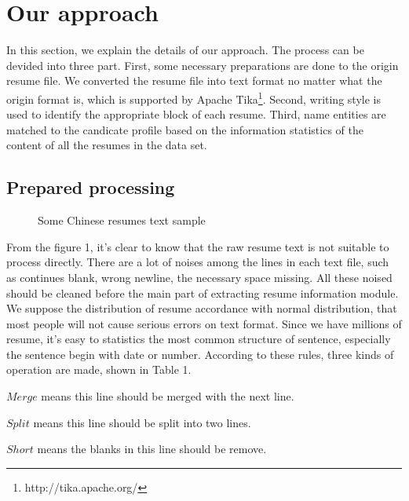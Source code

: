\documentclass{acm_proc_article-sp}
\begin{document}
\section{Our approach}

In this section, we explain the details of our approach. 
The process can be devided into three part. 
First, some necessary preparations are done to the origin resume file. 
We converted the resume file into text format no matter what the origin format is, which is supported by Apache Tika\footnote{http://tika.apache.org/}. 
Second, writing style is used to identify the appropriate  block of each resume.
Third, name entities are matched to the candicate profile based on the information statistics of the content of all the resumes in the data set. 

\subsection{Prepared processing}


\begin{figure}
\centering
{}
\caption{Some Chinese resumes text sample}
\end{figure}


From the figure 1, it's clear to know that the raw resume text is not suitable to process directly. 
There are a lot of noises among the lines in each text file, such as continues blank, wrong newline, the necessary space missing. 
All these noised should be cleaned before the main part of extracting resume information module. 
We suppose the distribution of resume accordance with normal distribution, that most people will not cause serious errors on text format.
Since we have millions of resume, it's easy to statistics the most common structure of sentence, especially the sentence begin with date or number. 
According to these rules, three kinds of operation are made, shown in Table 1.

$Merge$ means this line should be merged with the next line. 

$Split$ means this line should be split into two lines.

$Short$ means the blanks in this line should be remove. 
\end{document}
